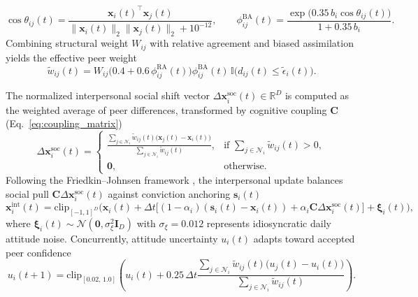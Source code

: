 \documentclass{article}
\begin{document}
\begin{equation}
    \cos\theta_{ij}(t) = \frac{\mathbf{x}_i(t)^\top \mathbf{x}_j(t)}{\|\mathbf{x}_i(t)\|_2 \|\mathbf{x}_j(t)\|_2 + 10^{-12}}, \qquad
    \phi_{ij}^{\mathrm{BA}}(t) = \frac{\exp\!\big(0.35\,b_i \cos\theta_{ij}(t)\big)}{1 + 0.35\,b_i}.
    \label{eq:biased_assimilation}
\end{equation}
Combining structural weight $W_{ij}$ with relative agreement and biased assimilation yields the effective peer weight
\begin{equation}
    \tilde{w}_{ij}(t) = W_{ij} \big(0.4 + 0.6\,\phi_{ij}^{\mathrm{RA}}(t)\big) \phi_{ij}^{\mathrm{BA}}(t) \, \mathbb{I}\!\big(d_{ij}(t) \le \tilde{\epsilon}_i(t)\big).
    \label{eq:effective_peer_weight}
\end{equation}

The normalized interpersonal social shift vector $\Delta \mathbf{x}_i^{\mathrm{soc}}(t) \in \mathbb{R}^D$ is computed as the weighted average of peer differences, transformed by cognitive coupling $\mathbf{C}$ (Eq.~\eqref{eq:coupling_matrix})
\begin{equation}
    \Delta \mathbf{x}_i^{\mathrm{soc}}(t) =
    \begin{cases}
        \displaystyle \frac{\sum_{j \in \mathcal{N}_i} \tilde{w}_{ij}(t) \big(\mathbf{x}_j(t) - \mathbf{x}_i(t)\big)}{\sum_{j \in \mathcal{N}_i} \tilde{w}_{ij}(t)}, & \text{if } \sum_{j \in \mathcal{N}_i} \tilde{w}_{ij}(t) > 0, \\[10pt]
        \mathbf{0}, & \text{otherwise}.
    \end{cases}
    \label{eq:social_shift}
\end{equation}
Following the Friedkin--Johnsen framework \citep{friedkin1990social, parsegov2017novel}, the interpersonal update balances social pull $\mathbf{C}\Delta \mathbf{x}_i^{\mathrm{soc}}(t)$ against conviction anchoring $\mathbf{s}_i(t)$
\begin{equation}
    \mathbf{x}_i^{\mathrm{int}}(t) = \mathrm{clip}_{[-1, 1]^D}\!\Big(
        \mathbf{x}_i(t) + \Delta t \big[(1 - \alpha_i)(\mathbf{s}_i(t) - \mathbf{x}_i(t)) + \alpha_i \mathbf{C}\Delta \mathbf{x}_i^{\mathrm{soc}}(t)\big] + \boldsymbol{\xi}_i(t)
    \Big),
    \label{eq:fj_interpersonal_update}
\end{equation}
where $\boldsymbol{\xi}_i(t) \sim \mathcal{N}(\mathbf{0}, \sigma_{\xi}^2 \mathbf{I}_D)$ with $\sigma_{\xi} = 0.012$ represents idiosyncratic daily attitude noise. Concurrently, attitude uncertainty $u_i(t)$ adapts toward accepted peer confidence \citep{deffuant2002how}
\begin{equation}
    u_i(t+1) = \mathrm{clip}_{[0.02,\, 1.0]}\!\left(
        u_i(t) + 0.25\,\Delta t \frac{\sum_{j \in \mathcal{N}_i} \tilde{w}_{ij}(t)\big(u_j(t) - u_i(t)\big)}{\sum_{j \in \mathcal{N}_i} \tilde{w}_{ij}(t)}
    \right).
    \label{eq:uncertainty_update}
\end{equation}
\end{document}
